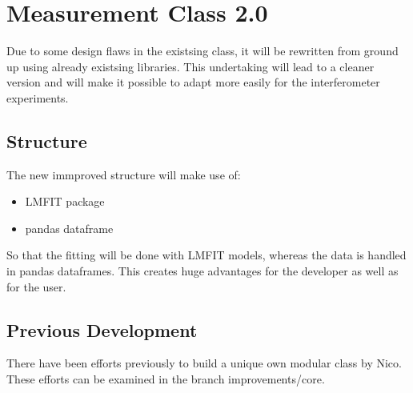 \documentclass[letterpaper,10pt,english]{sphinxmanual}
\begin{document}
\chapter{Measurement Class 2.0}
\label{\detokenize{measurement2:measurement-class-2-0}}\label{\detokenize{measurement2::doc}}
Due to some design flaws in the existsing {\hyperref[\detokenize{measurement:measurement.Measurement}]{}} class, it will be rewritten from ground up using already existsing libraries. This undertaking will lead to a cleaner version and will make it possible to adapt {\hyperref[\detokenize{measurement:measurement.Measurement}]{}} more easily for the interferometer experiments.


\section{Structure}
\label{\detokenize{measurement2:structure}}
The new immproved structure will make use of:
\begin{itemize}
\item {} 
LMFIT package

\item {} 
pandas dataframe

\end{itemize}

So that the fitting will be done with LMFIT models, whereas the data is handled in pandas dataframes. This creates huge advantages for the developer as well as for the user.


\section{Previous Development}
\label{\detokenize{measurement2:previous-development}}
There have been efforts previously to build a unique own modular {\hyperref[\detokenize{measurement:measurement.Measurement}]{}} class by Nico. These efforts can be examined in the branch improvements/core.
\end{document}
